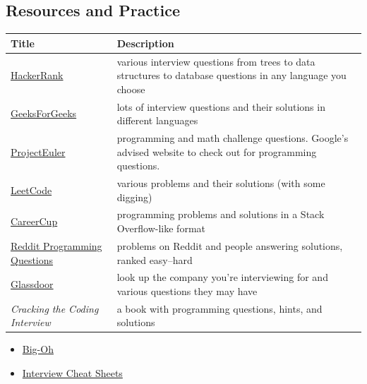 \documentclass{article}
\newcommand{\book}[1]{\textit{#1}}
\begin{document}
\subsection{Resources and Practice}
\begin{center}
\begin{tabular}{lp{10cm}}
  \toprule
  \textbf{Title} & \textbf{Description} \\
  \midrule
  \href{https://hackerrank.com}{HackerRank}
                 & various interview questions from trees to data structures to
                   database questions in any language you choose \\
\addlinespace[0.5em]
  \href{https://www.geeksforgeeks.org/}{GeeksForGeeks}
                 & lots of interview questions and their solutions in different
                   languages \\
\addlinespace[0.5em]
  \href{https://projecteuler.net/}{ProjectEuler}
                 & programming and math challenge questions. Google's advised
                   website to check out for programming questions. \\
\addlinespace[0.5em]
  \href{https://leetcode.com/}{LeetCode}
                 & various problems and their solutions (with some digging) \\
\addlinespace[0.5em]
  \href{https://www.careercup.com/}{CareerCup}
                 & programming problems and solutions in a Stack Overflow-like
                   format \\
\addlinespace[0.5em]
  \href{https://reddit.com/r/dailyprogrammer}{Reddit Programming Questions}
                 & problems on Reddit and people answering solutions, ranked
                   \hbox{easy--hard} \\
\addlinespace[0.5em]
  \href{https://glassdoor.com}{Glassdoor}
                 & look up the company you're interviewing for and various
                   questions they may have \\
\addlinespace[0.5em]
  \book{Cracking the Coding Interview}
                 & a book with programming questions, hints, and solutions \\
  \bottomrule
\end{tabular}
\end{center}

\begin{itemize}
\item \href{http://bigocheatsheet.com/}{Big-Oh}
\item \href{https://gist.github.com/TSiege/cbb0507082bb18ff7e4b}{Interview Cheat Sheets}
\end{itemize}
\end{document}
